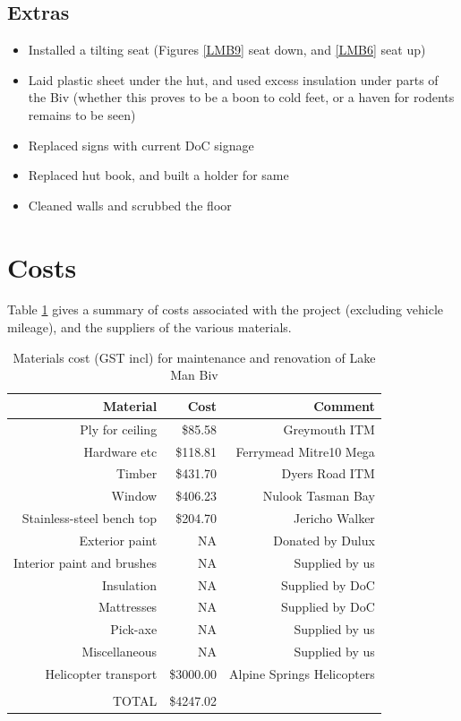 \documentclass[12pt]{article} %
\begin{document}
\subsection{Extras}

\begin{itemize}
 \item Installed a tilting seat (Figures \ref{LMB9} seat down, and \ref{LMB6} seat up)
 \item Laid plastic sheet under the hut, and used excess insulation under parts of the Biv (whether this proves to be a boon to cold feet, or a haven for rodents remains to be seen)
 \item Replaced signs with current DoC signage
 \item Replaced hut book, and built a holder for same
 \item Cleaned walls and scrubbed the floor
\end{itemize}

\section{Costs}

Table \ref{costs} gives a summary of costs associated with the project (excluding vehicle mileage), and the suppliers of the various materials.

\begin{table}[ht]
\caption{Materials cost (GST incl) for maintenance and renovation of Lake Man Biv} %
\label{costs}
\centering %
\begin{tabular}{rrr}
\hline
Material & Cost & Comment \\ [0.5ex]
\hline %
Ply for ceiling & \$85.58 & Greymouth ITM\\
Hardware etc & \$118.81 & Ferrymead Mitre10 Mega\\
Timber & \$431.70 & Dyers Road ITM\\
Window & \$406.23 & Nulook Tasman Bay\\
Stainless-steel bench top & \$204.70 & Jericho Walker\\
Exterior paint & NA & Donated by Dulux\\
Interior paint and brushes & NA & Supplied by us\\
Insulation & NA & Supplied by DoC\\
Mattresses & NA & Supplied by DoC\\
Pick-axe & NA & Supplied by us\\
Miscellaneous & NA & Supplied by us\\
Helicopter transport & \$3000.00 & Alpine Springs Helicopters\\ [1ex] %
\hline \\
TOTAL & \$4247.02\\
\hline \hline %
\end{tabular}
\label{costs} %
\end{table}
\end{document}
